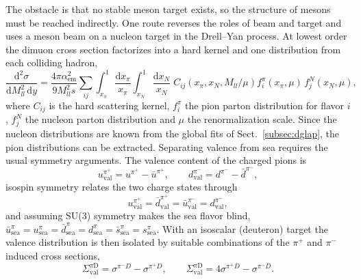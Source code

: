 The obstacle is that no stable meson target exists, so the structure of mesons must be
reached indirectly. One route reverses the roles of beam and target and uses a meson beam
on a nucleon target in the Drell--Yan process. At lowest order the dimuon cross section
factorizes into a hard kernel and one distribution from each colliding hadron,
\begin{equation}
    \frac{\mathrm{d}^{2}\sigma}{\mathrm{d}M_{ll}^{2}\,\mathrm{d}y}
    = \frac{4\pi\alpha_{\mathrm{em}}^{2}}{9M_{ll}^{2}s}\sum_{ij}
      \int_{x_{\pi}}^{1}\frac{\mathrm{d}x_{\pi}}{x_{\pi}}
      \int_{x_{N}}^{1}\frac{\mathrm{d}x_{N}}{x_{N}}\;
      C_{ij}\!\left(x_{\pi},x_{N},M_{ll}/\mu\right)
      f_{i}^{\pi}(x_{\pi},\mu)\,f_{j}^{N}(x_{N},\mu),
    \label{eq:pion-dy}
\end{equation}
where $C_{ij}$ is the hard scattering kernel, $f_{i}^{\pi}$ the pion parton distribution
for flavor $i$, $f_{j}^{N}$ the nucleon parton distribution and $\mu$ the renormalization
scale. Since the nucleon distributions are known from the global fits of
Sect.~\ref{subsec:dglap}, the pion distributions can be extracted. Separating valence from
sea requires the usual symmetry arguments. The valence content of the charged pions is
\begin{equation}
    u_{\mathrm{val}}^{\pi^{+}} = u^{\pi^{+}} - \bar u^{\pi^{+}},
    \qquad
    d_{\mathrm{val}}^{\pi^{-}} = d^{\pi^{-}} - \bar d^{\pi^{-}},
    \label{eq:pion-valence}
\end{equation}
isospin symmetry relates the two charge states through
\begin{equation}
    u_{\mathrm{val}}^{\pi^{+}} = \bar d_{\mathrm{val}}^{\pi^{+}}
    = \bar u_{\mathrm{val}}^{\pi^{-}} = d_{\mathrm{val}}^{\pi^{-}},
    \label{eq:pion-isospin}
\end{equation}
and assuming SU(3) symmetry makes the sea flavor blind,
$\bar u_{\mathrm{sea}}^{\pi}=u_{\mathrm{sea}}^{\pi}=\bar d_{\mathrm{sea}}^{\pi}
=d_{\mathrm{sea}}^{\pi}=\bar s_{\mathrm{sea}}^{\pi}=s_{\mathrm{sea}}^{\pi}$. With an
isoscalar (deuteron) target the valence distribution is then isolated by suitable
combinations of the $\pi^{+}$ and $\pi^{-}$ induced cross sections,
\begin{equation}
    \Sigma_{\mathrm{val}}^{\pi\mathrm{D}} = \sigma^{\pi^{-}D} - \sigma^{\pi^{+}D},
    \qquad
    \Sigma_{\mathrm{val}}^{\pi\mathrm{D}} = 4\sigma^{\pi^{+}D} - \sigma^{\pi^{-}D}.
    \label{eq:pion-valence-combinations}
\end{equation}

